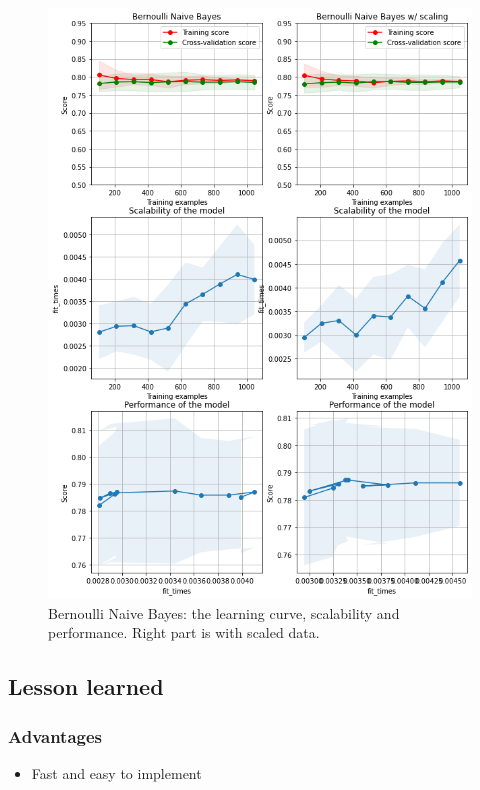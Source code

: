 \documentclass{article}
\begin{document}
\begin{figure}[H]
	\includegraphics[width=\textwidth,height=\textheight,keepaspectratio]{bernoulliNB_curve.png}
	\caption{Bernoulli Naive Bayes: the learning curve, scalability and performance. Right part is with scaled data.}
	\label{fig:Bernoulli-curve}
\end{figure}

\subsection{Lesson learned}
\subsubsection{Advantages}
\begin{itemize}
	\item Fast and easy to implement
\end{itemize}
\end{document}
